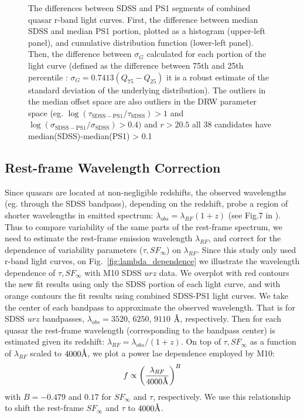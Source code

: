 \documentclass[twocolumn]{aastex62}
\let\oldAA\AA
\renewcommand{\AA}{\text{\normalfont\oldAA}}
\begin{document}
\begin{figure} %
\caption{The differences between SDSS and PS1 segments of combined quasar r-band light curves. First, the difference between median SDSS and median PS1 portion, plotted as a histogram (upper-left panel), and cumulative distribution function (lower-left panel). Then, the difference between $\sigma_{G}$ calculated for each portion of the light curve (defined as the difference between 75th and 25th percentile : $\sigma_{G} = 0.7413(Q_{75} - Q_{25})$ it is a robust estimate of the standard deviation of the underlying distribution). The outliers in the median offset space are also outliers in the DRW parameter space (eg. $\log{(\tau_{\mathrm{SDSS-PS1}} /  \tau_{\mathrm{SDSS}})} > 1$   and   $\log{(\sigma_{\mathrm{SDSS-PS1}} / \sigma_{\mathrm{SDSS}})}   > 0.4  )$  and $r > 20.5$ all  38 candidates have  median(SDSS)-median(PS1)  > 0.1  }
\label{fig:median_offsets}
\end{figure}







\subsection{Rest-frame Wavelength Correction}
Since quasars are located at non-negligible redshifts, the observed wavelengths (eg. through the SDSS bandpass), depending on the redshift, probe a region of shorter wavelengths in emitted spectrum: $\lambda_{obs} {=}\lambda_{RF}  (1+z)$ (see Fig.7 in \citealt{shen2018}). Thus to compare variability of the same parts of the rest-frame spectrum, we need to estimate the rest-frame emission wavelength $\lambda_{RF}$, and correct for the dependence of variability parameters ($\tau, SF_{\infty}$) on $\lambda_{RF}$. Since this study only used r-band light curves, on Fig.~\ref{fig:lambda_dependence} we illustrate the wavelength dependence of $\tau, SF_{\infty}$ with M10 SDSS $urz$ data. We overplot with red contours the new fit results using only the SDSS portion of each light curve, and with orange contours the fit results using combined SDSS-PS1 light curves. We take the center of each bandpass to approximate the  observed wavelength. That is for SDSS $urz$ bandpasses,  $\lambda_{obs} = 3520$, $6250$, $9110$ $\mbox{\AA}$, respectively. Then for each quasar the rest-frame wavelength (corresponding to the bandpass center) is estimated given its redshift:  $\lambda_{RF} = \lambda_{obs} / (1+z)$.  On top of $\tau, SF_{\infty}$ as a function of $\lambda_{RF}$ scaled to  $4000 \mbox{\AA}$, we plot a power lae dependence employed by M10:
\begin{equation}
f \propto \left( \frac{\lambda_{RF}}{4000 \mbox{\AA}} \right)^{B}
\end{equation}
with  $B=-0.479$ and $0.17$ for $SF_{\infty}$ and $\tau$, respectively. We use this relationship to shift the rest-frame $SF_{\infty}$ and $\tau$ to   $4000 \mbox{\AA}$. 
\end{document}
